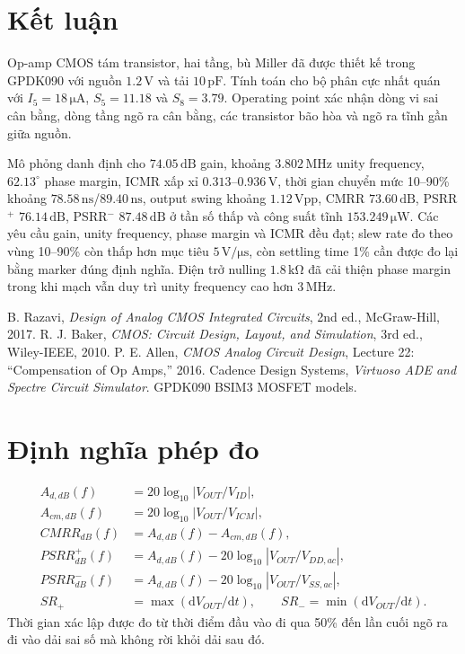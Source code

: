 \documentclass[11pt,a4paper]{report}
\newcommand{\SI}[2]{\ensuremath{#1\,\mathrm{#2}}}
\newcommand{\SIrange}[3]{\ensuremath{#1\text{--}#2\,\mathrm{#3}}}
\newcommand{\ang}[1]{\ensuremath{#1^{\circ}}}
\newcommand{\micro}{\mu}\newcommand{\dd}{\mathrm d}\newcommand{\ohm}{\Omega}
\begin{document}
\chapter{Kết luận}
Op-amp CMOS tám transistor, hai tầng, bù Miller đã được thiết kế trong GPDK090 với nguồn \SI{1.2}{V} và tải \SI{10}{pF}. Tính toán cho bộ phân cực nhất quán với $I_5=\SI{18}{\micro A}$, $S_5=11.18$ và $S_8=3.79$. Operating point xác nhận dòng vi sai cân bằng, dòng tầng ngõ ra cân bằng, các transistor bão hòa và ngõ ra tĩnh gần giữa nguồn.

Mô phỏng danh định cho \SI{74.05}{dB} gain, khoảng \SI{3.802}{MHz} unity frequency, \ang{62.13} phase margin, ICMR xấp xỉ \SIrange{0.313}{0.936}{V}, thời gian chuyển mức 10--90\% khoảng \SI{78.58}{ns}/\SI{89.40}{ns}, output swing khoảng \SI{1.12}{Vpp}, CMRR \SI{73.60}{dB}, PSRR$^+$ \SI{76.14}{dB}, PSRR$^-$ \SI{87.48}{dB} ở tần số thấp và công suất tĩnh \SI{153.249}{\micro W}. Các yêu cầu gain, unity frequency, phase margin và ICMR đều đạt; slew rate đo theo vùng 10--90\% còn thấp hơn mục tiêu \SI{5}{V/\micro s}, còn settling time 1\% cần được đo lại bằng marker đúng định nghĩa. Điện trở nulling \SI{1.8}{k\ohm} đã cải thiện phase margin trong khi mạch vẫn duy trì unity frequency cao hơn \SI{3}{MHz}.

\begin{thebibliography}{9}
B. Razavi, \emph{Design of Analog CMOS Integrated Circuits}, 2nd ed., McGraw-Hill, 2017.
R. J. Baker, \emph{CMOS: Circuit Design, Layout, and Simulation}, 3rd ed., Wiley-IEEE, 2010.
P. E. Allen, \emph{CMOS Analog Circuit Design}, Lecture 22:
``Compensation of Op Amps,'' 2016.
Cadence Design Systems, \emph{Virtuoso ADE and Spectre Circuit Simulator}.
GPDK090 BSIM3 MOSFET models.
\end{thebibliography}

\appendix
\chapter{Định nghĩa phép đo}
\begin{align}
A_{d,dB}(f)&=20\log_{10}\left|V_{OUT}/V_{ID}\right|,\\
A_{cm,dB}(f)&=20\log_{10}\left|V_{OUT}/V_{ICM}\right|,\\
CMRR_{dB}(f)&=A_{d,dB}(f)-A_{cm,dB}(f),\\
PSRR^+_{dB}(f)&=A_{d,dB}(f)-20\log_{10}\left|V_{OUT}/V_{DD,ac}\right|,\\
PSRR^-_{dB}(f)&=A_{d,dB}(f)-20\log_{10}\left|V_{OUT}/V_{SS,ac}\right|,\\
SR_+&=\max(\dd V_{OUT}/\dd t),\qquad SR_-=\min(\dd V_{OUT}/\dd t).
\end{align}
Thời gian xác lập được đo từ thời điểm đầu vào đi qua 50\% đến lần cuối ngõ ra đi vào dải sai số mà không rời khỏi dải sau đó.
\end{document}
